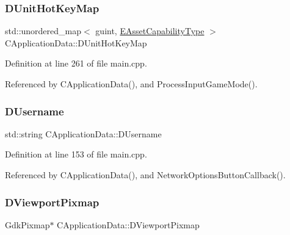 \subsubsection{\texorpdfstring{D\+Unit\+Hot\+Key\+Map}{DUnitHotKeyMap}}
{\footnotesize\ttfamily std\+::unordered\+\_\+map$<$ guint, \hyperlink{GameDataTypes_8h_a35b98ce26aca678b03c6f9f76e4778ce}{E\+Asset\+Capability\+Type} $>$ C\+Application\+Data\+::\+D\+Unit\+Hot\+Key\+Map\hspace{0.3cm}{\ttfamily [protected]}}



Definition at line 261 of file main.\+cpp.



Referenced by C\+Application\+Data(), and Process\+Input\+Game\+Mode().

\hypertarget{classCApplicationData_aedfdb512317e5b62d0bbbcddcd48dfb8}{}\label{classCApplicationData_aedfdb512317e5b62d0bbbcddcd48dfb8} 
\subsubsection{\texorpdfstring{D\+Username}{DUsername}}
{\footnotesize\ttfamily std\+::string C\+Application\+Data\+::\+D\+Username\hspace{0.3cm}{\ttfamily [protected]}}



Definition at line 153 of file main.\+cpp.



Referenced by C\+Application\+Data(), and Network\+Options\+Button\+Callback().

\hypertarget{classCApplicationData_ac8801e116d0c49776c9f3db7415287fe}{}\label{classCApplicationData_ac8801e116d0c49776c9f3db7415287fe} 
\subsubsection{\texorpdfstring{D\+Viewport\+Pixmap}{DViewportPixmap}}
{\footnotesize\ttfamily Gdk\+Pixmap$\ast$ C\+Application\+Data\+::\+D\+Viewport\+Pixmap\hspace{0.3cm}{\ttfamily [protected]}}



